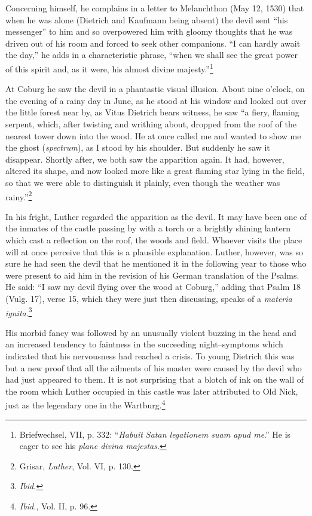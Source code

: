 Concerning himself, he complains in a letter to Melanchthon (May
12, 1530) that when he was alone (Dietrich and Kaufmann being
absent) the devil sent “his messenger” to him and so overpowered him
with gloomy thoughts that he was driven out of his room and forced
to seek other companions. “I can hardly await the day,” he adds in a
characteristic phrase, “when we shall see the great power of this
spirit and, as it were, his almost divine majesty.”\footnote
{Briefwechsel, VII, p. 332: “\textit{Habuit Satan legationem suam apud me}.” He is eager to
see his \textit{plane divina majestas}.}

At Coburg he saw the devil in a phantastic visual illusion. About
nine o’clock, on the evening of a rainy day in June, as he stood at his
window and looked out over the little forest near by, as Vitus Dietrich
bears witness, he saw “a fiery, flaming serpent, which, after twisting
and writhing about, dropped from the roof of the nearest tower
down into the wood. He at once called me and wanted to show me
the ghost (\textit{spectrum}), as I stood by his shoulder. But suddenly he saw
it disappear. Shortly after, we both saw the apparition again. It had,
however, altered its shape, and now looked more like a great flaming
star lying in the field, so that we were able to distinguish it plainly,
even though the weather was rainy.”\footnote{Grisar, \textit{Luther}, Vol. VI, p. 130.}

In his fright, Luther regarded
the apparition as the devil. It may have been one of the inmates of the
castle passing by with a torch or a brightly shining lantern which cast
a reflection on the roof, the woods and field. Whoever visits the place
will at once perceive that this is a plausible explanation. Luther, however,
was so sure he had seen the devil that he mentioned it in the following
year to those who were present to aid him in the revision of his
German translation of the Psalms. He said: “I saw my devil flying
over the wood at Coburg,” adding that Psalm 18 (Vulg. 17), verse
15, which they were just then discussing, speaks of a \textit{materia ignita}.\footnote{\textit{Ibid.}}


His morbid fancy was followed by an unusually violent buzzing in
the head and an increased tendency to faintness in the succeeding
night--symptoms which indicated that his nervousness had reached
a crisis. To young Dietrich this was but a new proof that all the ailments
of his master were caused by the devil who had just appeared
to them. It is not surprising that a blotch of ink on the wall of the
room which Luther occupied in this castle was later attributed to Old
Nick, just as the legendary one in the Wartburg.\footnote{\textit{Ibid.}, Vol. II, p. 96.}

